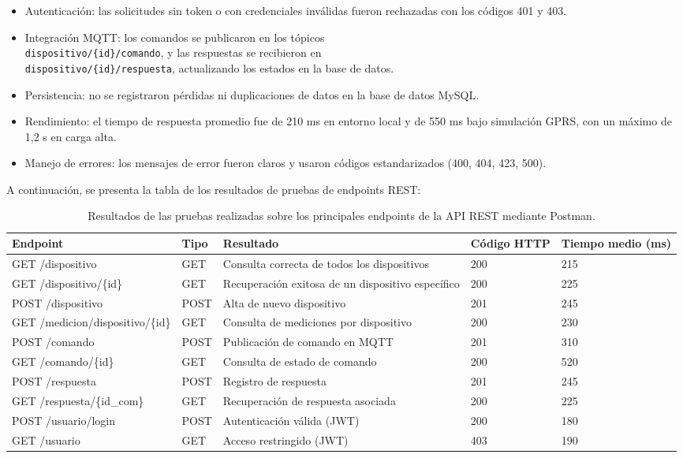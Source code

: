 \begin{itemize}
    \item Autenticación: las solicitudes sin token o con credenciales inválidas fueron rechazadas con los códigos 401 y 403.  
    \item Integración MQTT: los comandos se publicaron en los tópicos \\ \texttt{dispositivo/\{id\}/comando}, y las respuestas se recibieron en \\ \texttt{dispositivo/\{id\}/respuesta}, actualizando los estados en la base de datos.
    \item Persistencia: no se registraron pérdidas ni duplicaciones de datos en la base de datos MySQL.
    \item Rendimiento: el tiempo de respuesta promedio fue de 210 ms en entorno local y de 550 ms bajo simulación GPRS, con un máximo de 1,2 s en carga alta.
    \item Manejo de errores: los mensajes de error fueron claros y usaron códigos estandarizados (400, 404, 423, 500).
    
\end{itemize}

A continuación, se presenta la tabla de los resultados de pruebas de endpoints REST:

\begin{table}[H]
	\centering
	\caption[Resultados de pruebas de endpoints REST]{Resultados de las pruebas realizadas sobre los principales endpoints de la API REST mediante Postman.}
	\begin{tabular}{l l p{3.4cm} p{1cm} p{1cm}}    
		\toprule
		\textbf{Endpoint} & \textbf{Tipo} & \textbf{Resultado} & \textbf{Código HTTP} & \textbf{Tiempo medio (ms)} \\
		\midrule
		GET /dispositivo & GET & Consulta correcta de todos los dispositivos & 200 & 215 \\
		GET /dispositivo/\{id\} & GET & Recuperación exitosa de un dispositivo específico & 200 & 225 \\
		POST /dispositivo & POST & Alta de nuevo dispositivo & 201 & 245 \\
		GET /medicion/dispositivo/\{id\} & GET & Consulta de mediciones por dispositivo & 200 & 230 \\
		POST /comando & POST & Publicación de comando en MQTT & 201 & 310 \\
		GET /comando/\{id\} & GET & Consulta de estado de comando & 200 & 520 \\
		POST /respuesta & POST & Registro de respuesta & 201 & 245 \\
		GET /respuesta/\{id\_com\} & GET & Recuperación de respuesta asociada & 200 & 225 \\
		POST /usuario/login & POST & Autenticación válida (JWT) & 200 & 180 \\
		GET /usuario & GET & Acceso restringido (JWT) & 403 & 190 \\
		\bottomrule
	\end{tabular}
	\label{tab:resultados_api}
\end{table}

